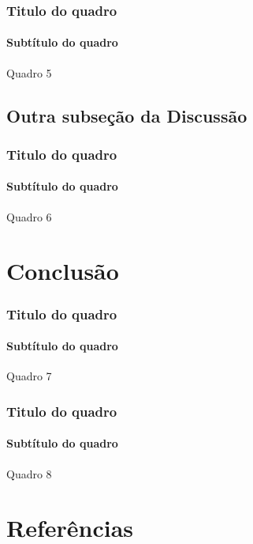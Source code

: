 \documentclass{beamer}
\begin{document}
\begin{frame}
	\frametitle{Titulo do quadro}
	\framesubtitle{Subtítulo do quadro}
	
	Quadro 5
\end{frame}

\subsection{Outra subseção da Discussão}
\begin{frame}
	\frametitle{Titulo do quadro}
	\framesubtitle{Subtítulo do quadro}
	
	Quadro 6
\end{frame}

\section{Conclusão}
\begin{frame}
	\frametitle{Titulo do quadro}
	\framesubtitle{Subtítulo do quadro}
	
	Quadro 7
\end{frame}

\begin{frame}
	\frametitle{Titulo do quadro}
	\framesubtitle{Subtítulo do quadro}
	
	Quadro 8
\end{frame}

\section*{Referências}
\begin{frame}
	
	
\end{frame}
\end{document}
